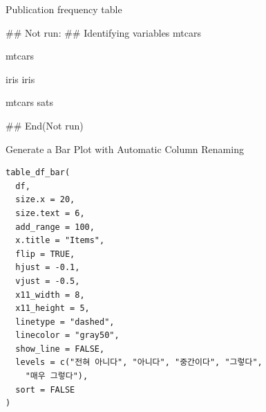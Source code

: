 \documentclass[a4paper]{book}
\begin{document}
%
\begin{Value}
Publication frequency table
\end{Value}
%
\begin{Examples}
\begin{ExampleCode}

## Not run: 
## Identifying variables
 mtcars %

 mtcars %

 iris %
 iris %


 mtcars %
 sats %



## End(Not run)


\end{ExampleCode}
\end{Examples}
%
\begin{Description}
Generate a Bar Plot with Automatic Column Renaming
\end{Description}
%
\begin{Usage}
\begin{verbatim}
table_df_bar(
  df,
  size.x = 20,
  size.text = 6,
  add_range = 100,
  x.title = "Items",
  flip = TRUE,
  hjust = -0.1,
  vjust = -0.5,
  x11_width = 8,
  x11_height = 5,
  linetype = "dashed",
  linecolor = "gray50",
  show_line = FALSE,
  levels = c("전혀 아니다", "아니다", "중간이다", "그렇다",
    "매우 그렇다"),
  sort = FALSE
)
\end{verbatim}
\end{Usage}
%
\end{document}
